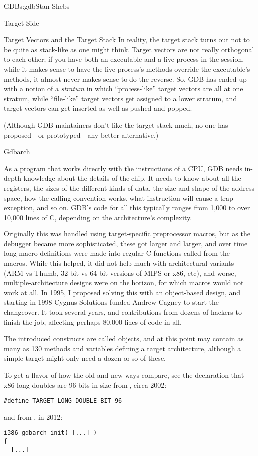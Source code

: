 \begin{aosachapter}{GDB}{s:gdb}{Stan Shebs}
\begin{aosasect1}{Target Side}
\begin{aosasect2}{Target Vectors and the Target Stack}
In reality, the target stack turns out not to be quite as stack-like
as one might think.  Target vectors are not really orthogonal to each
other; if you have both an executable and a live process in the
session, while it makes sense to have the live process's methods
override the executable's methods, it almost never makes sense to do
the reverse.  So, GDB has ended up with a notion of a {\em stratum} in
which ``process-like'' target vectors are all at one stratum, while
``file-like'' target vectors get assigned to a lower stratum, and
target vectors can get inserted as well as pushed and popped.

(Although GDB maintainers don't like the target stack much, no one has
proposed---or prototyped---any better alternative.)

\end{aosasect2}

\begin{aosasect2}{Gdbarch}

As a program that works directly with the instructions of a CPU, GDB
needs in-depth knowledge about the details of the chip.  It needs to
know about all the registers, the sizes of the different kinds of
data, the size and shape of the address space, how the calling
convention works, what instruction will cause a trap exception, and so
on.  GDB's code for all this typically ranges from 1,000 to over
10,000 lines of C, depending on the architecture's complexity.

Originally this was handled using target-specific preprocessor macros,
but as the debugger became more sophisticated, these got larger and
larger, and over time long macro definitions were made into regular C
functions called from the macros.  While this helped, it did not help
much with architectural variants (ARM vs Thumb, 32-bit vs 64-bit
versions of MIPS or x86, etc), and worse, multiple-architecture
designs were on the horizon, for which macros would not work at all.
In 1995, I proposed solving this with an object-based design, and
starting in 1998 Cygnus Solutions funded Andrew Cagney to start the
changeover.  It took several years, and contributions from dozens of
hackers to finish the job, affecting perhaps 80,000 lines of code in
all.

The introduced constructs are called  objects, and at
this point may contain as many as 130 methods and variables defining a
target architecture, although a simple target might only need a dozen
or so of these.

To get a flavor of how the old and new ways compare, see the
declaration that x86 long doubles are 96 bits in size from
, circa 2002:
\begin{verbatim}
#define TARGET_LONG_DOUBLE_BIT 96
\end{verbatim}
and from , in 2012:
\begin{verbatim}
i386_gdbarch_init( [...] )
{
  [...]


\end{verbatim}
\end{aosasect2}
\end{aosasect1}
\end{aosachapter}
